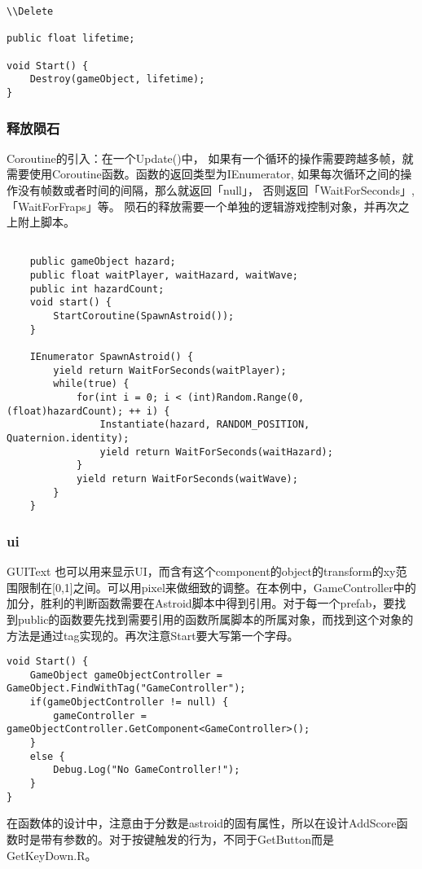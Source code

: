 \documentclass[10pt, a4paper]{article}
\begin{document}
\begin{lstlisting} 
\\Delete

public float lifetime;

void Start() {
    Destroy(gameObject, lifetime);
}
\end{lstlisting}

        \subsubsection{释放陨石}
            Coroutine的引入：在一个Update()中， 如果有一个循环的操作需要跨越多帧，就需要使用Coroutine函数。函数的返回类型为IEnumerator, 如果每次循环之间的操作没有帧数或者时间的间隔，那么就返回「null」， 否则返回「WaitForSeconds」,「WaitForFraps」等。 陨石的释放需要一个单独的逻辑游戏控制对象，并再次之上附上脚本。
\begin{lstlisting}
    
    public gameObject hazard; 
    public float waitPlayer, waitHazard, waitWave;
    public int hazardCount;
    void start() {
        StartCoroutine(SpawnAstroid());
    }

    IEnumerator SpawnAstroid() {
        yield return WaitForSeconds(waitPlayer);
        while(true) {
            for(int i = 0; i < (int)Random.Range(0, (float)hazardCount); ++ i) {
                Instantiate(hazard, RANDOM_POSITION, Quaternion.identity);
                yield return WaitForSeconds(waitHazard);
            }
            yield return WaitForSeconds(waitWave);
        }
    }
\end{lstlisting}
        \subsubsection{ui}
            GUIText 也可以用来显示UI，而含有这个component的object的transform的xy范围限制在[0,1]之间。可以用pixel来做细致的调整。在本例中，GameController中的加分，胜利的判断函数需要在Astroid脚本中得到引用。对于每一个prefab，要找到public的函数要先找到需要引用的函数所属脚本的所属对象，而找到这个对象的方法是通过tag实现的。再次注意Start要大写第一个字母。
\begin{lstlisting}
void Start() {
    GameObject gameObjectController = GameObject.FindWithTag("GameController"); 
    if(gameObjectController != null) {
        gameController = gameObjectController.GetComponent<GameController>();
    }
    else {
        Debug.Log("No GameController!"); 
    }
}
\end{lstlisting}
        在函数体的设计中，注意由于分数是astroid的固有属性，所以在设计AddScore函数时是带有参数的。对于按键触发的行为，不同于GetButton而是GetKeyDown.R。
\end{document}
